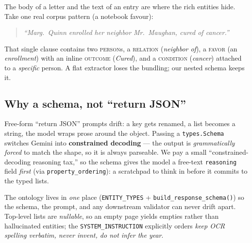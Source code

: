 \documentclass[11pt]{article}
\newcommand{\code}[1]{\texttt{#1}}
\newcommand{\type}[1]{\textsc{#1}}
\begin{document}
The body of a letter and the text of an entry are where the rich entities hide.
Take one real corpus pattern (a notebook favour):

\begin{quote}\itshape
``Marg.\ Quinn enrolled her neighbor Mr.\ Maughan, cured of cancer.''
\end{quote}

That single clause contains two \type{person}s, a \type{relation}
(\emph{neighbor of}), a \type{favor} (an \emph{enrollment}) with an inline
\type{outcome} (\emph{Cured}), and a \type{condition} (\emph{cancer}) attached to a
\emph{specific} person. A flat extractor loses the bundling; our nested schema
keeps it.

\subsection{Why a schema, not ``return JSON''}

Free-form ``return JSON'' prompts drift: a key gets renamed, a list becomes a
string, the model wraps prose around the object. Passing a \code{types.Schema}
switches Gemini into \textbf{constrained decoding} --- the output is
\emph{grammatically forced} to match the shape, so it is always parseable. We pay a
small ``constrained-decoding reasoning tax,'' so the schema gives the model a
free-text \code{reasoning} field \emph{first} (via \code{property\_ordering}): a
scratchpad to think in before it commits to the typed lists.

The ontology lives in \emph{one} place (\code{ENTITY\_TYPES} +
\code{build\_response\_schema()}) so the schema, the prompt, and any downstream
validator can never drift apart. Top-level lists are \emph{nullable}, so an empty
page yields empties rather than hallucinated entities; the \code{SYSTEM\_INSTRUCTION}
explicitly orders \emph{keep OCR spelling verbatim, never invent, do not infer the
year}.
\end{document}
